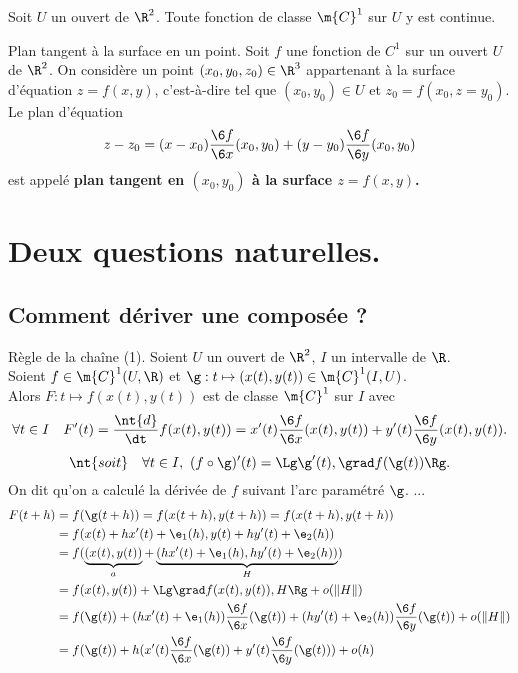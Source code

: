 \documentclass[11pt]{article}
\renewcommand*{\C}{\m{C}}
\begin{document}
\begin{corr}{}{}
    Soit $U$ un ouvert de $\R^2$. Toute fonction de classe $\C^1$ sur $U$ y est continue.
\end{corr}

\begin{defi}{Plan tangent à la surface en un point.}{}
    Soit $f$ une fonction de $C^1$ sur un ouvert $U$ de $\R^2$. On considère un point $(x_0,y_0,z_0)\in\R^3$ appartenant à la surface d'équation $z=f(x,y)$, c'est-à-dire tel que $(x_0,y_0)\in U$ et $z_0=f(x_0,z=y_0)$.\\
    Le plan d'équation
    \begin{equation*}
        z-z_0=(x-x_0)\frac{\6 f}{\6 x}(x_0, y_0)+(y-y_0)\frac{\6 f}{\6 y}(x_0,y_0)
    \end{equation*}
    est appelé \bf{plan tangent} en $(x_0,y_0)$ à la surface $z=f(x,y)$.
\end{defi}

\section{Deux questions naturelles.}

\subsection{Comment dériver une composée ?}

\begin{thm}{Règle de la chaîne (1).}{}
    Soient $U$ un ouvert de $\R^2$, $I$ un intervalle de $\R$.\\
    Soient $f\in\C^1(U,\R)$ et $\g:t\mapsto (x(t),y(t))\in\C^1(I,U)$.\\
    Alors $F:t\mapsto f(x(t),y(t))$ est de classe $\C^1$ sur $I$ avec
    \begin{equation*}
        \forall t \in I \quad F'(t)=\frac{\nt{d}}{\dt}f(x(t),y(t))=x'(t)\frac{\6 f}{\6 x}(x(t),y(t))+y'(t)\frac{\6 f}{\6 y}(x(t), y(t)).
    \end{equation*}
    \begin{equation*}
        \nt{soit} \quad \forall t \in I, ~ (f\circ \g)'(t)=\Lg \g'(t), \grad f(\g(t)) \Rg.
    \end{equation*}
    On dit qu'on a calculé la dérivée de $f$ suivant l'arc paramétré $\g$.
    \tcblower
    ...
    \begin{align*}
        F(t+h)&=f(\g(t+h))=f(x(t+h),y(t+h))=f(x(t+h),y(t+h))\\
        &=f(x(t)+hx'(t)+\e_1(h),y(t)+hy'(t)+\e_2(h))\\
        &=f(\underbrace{(x(t),y(t))}_a+\underbrace{(hx'(t)+\e_1(h),hy'(t)+\e_2(h))}_H)\\
        &=f(x(t),y(t))+\Lg \grad f(x(t),y(t)), H\Rg+o(\|H\|)\\
        &=f(\g(t))+(hx'(t)+\e_1(h))\frac{\6 f}{\6 x}(\g(t))+(hy'(t)+\e_2(h))\frac{\6 f}{\6 y}(\g(t))+o(\|H\|)\\
        &=f(\g(t))+h(x'(t)\frac{\6 f}{\6 x}(\g(t))+y'(t)\frac{\6 f}{\6 y}(\g(t)))+o(h)
    \end{align*}
\end{thm}
\end{document}
